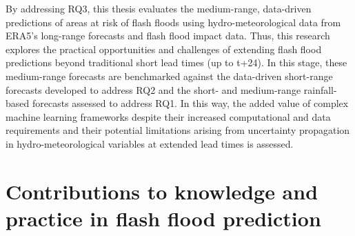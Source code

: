 By addressing RQ3, this thesis evaluates the medium-range, data-driven predictions of areas at risk of flash floods using hydro-meteorological data from ERA5's long-range forecasts and flash flood impact data. Thus, this research explores the practical opportunities and challenges of extending flash flood predictions beyond traditional short lead times (up to t+24). In this stage, these medium-range forecasts are benchmarked against the data-driven short-range forecasts developed to address RQ2 and the short- and medium-range rainfall-based forecasts assessed to address RQ1. In this way, the added value of complex machine learning frameworks despite their increased computational and data requirements and their potential limitations arising from uncertainty propagation in hydro-meteorological variables at extended lead times is assessed.



























\section{Contributions to knowledge and practice in flash flood prediction}


